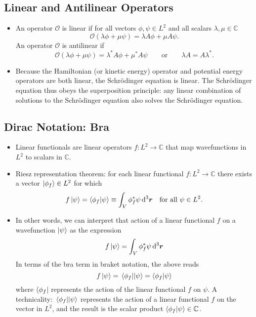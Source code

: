 \documentclass[11pt, a4paper]{article}
\newcommand{\diff}{\mathop{}\!\mathrm{d}} %
\newcommand{\dr}{\diff^{3} \r}  %
\newcommand{\eqtext}[1]{\qquad \text{#1} \qquad}
\newcommand{\Schro}{Schr\"{o}dinger\xspace}
\renewcommand{\vec}[1]{\bm{#1}}  %
\renewcommand{\r}{\vec{r}}  %
\renewcommand{\O}{\mathcal{O}}  %
\newcommand{\p}{\psi}  %
\begin{document}
\subsection{Linear and Antilinear Operators}
\begin{itemize}
	\item An operator $ \O $ is linear if for all vectors $ \phi, \psi \in L^{2} $ and all scalars $ \lambda, \mu \in \mathbb{C} $
	\begin{equation*}
		\O(\lambda \phi + \mu \p)  = \lambda A \phi + \mu A \p.
	\end{equation*}
	An operator $ \O $ is antilinear if
	\begin{equation*}
		\O(\lambda \phi + \mu \p)  = \lambda^{*} A \phi + \mu^{*} A \p \eqtext{or} \lambda A = A \lambda^{*}.
	\end{equation*}
	
	\item Because the Hamiltonian (or kinetic energy) operator and potential energy operators are both linear, the \Schro equation is linear. The \Schro equation thus obeys the superposition principle: any linear combination of solutions to the \Schro equation also solves the \Schro equation.
\end{itemize}

\subsection{Dirac Notation: Bra}
\begin{itemize}
	\item Linear functionals are linear operators $ f:L^{2} \to \mathbb{C} $ that map wavefunctions in $ L^{2} $ to scalars in $ \mathbb{C} $. 
	
	\item Riesz representation theorem: for each linear functional $ f:L^{2} \to \mathbb{C} $ there exists a vector $ \ket{\phi_{f}} \in L^{2} $ for which 
	\begin{equation*}
		f\ket{\psi} = \braket{\phi_{f}}{\psi} \equiv \int_{V} \phi_{f}^{*} \psi \dr  \quad \text{for all } \psi \in L^{2}.
	\end{equation*}
	
	\item In other words, we can interpret that action of a linear functional $ f $ on a wavefunction $ \ket{\psi} $ as the expression
	\begin{equation*}
		f\ket{\psi} =  \int_{V} \phi_{f}^{*} \psi \dr
	\end{equation*}
	In terms of the bra term in braket notation, the above reads
	\begin{equation*}
		f \ket{\psi} = \mel{\phi_{f}}{}{\psi} = \braket{\phi_{f}}{\psi}
	\end{equation*}
	where $ \bra{\phi_{f}} $ represents the action of the linear functional $ f $ on $ \psi $. A technicality:  $ \mel{\phi_{f}}{}{\psi}  $ represents the action of a linear functional $ f $ on the vector in $ L^{2} $, and the result is the scalar product $ \braket{\phi_{f}}{\psi} \in \mathbb{C} $. 
	
\end{itemize}
\end{document}
